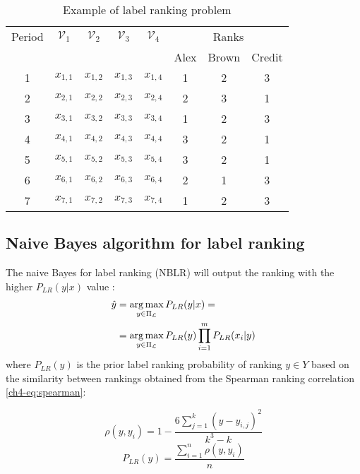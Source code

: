 \documentclass{llncs}\usepackage[]{graphicx}\usepackage[]{color}
\DeclareMathOperator*{\argmax}{arg\,max}
\begin{document}
\begin{table}
\caption{Example of label ranking problem}
\begin{center}
 \begin{tabular}{cccccccc}
\toprule
Period & $\mathcal{V}_1$ & $\mathcal{V}_2$ & $\mathcal{V}_3$ & $\mathcal{V}_4$ &\multicolumn{3}{c}{Ranks}\\
\cline{6-8}
&&&&&Alex&Brown&Credit\\
\midrule
   1 & $x_{1,1}$ & $x_{1,2}$ & $x_{1,3}$ & $x_{1,4}$ &   1 &   2 &   3 \\ 
    2 & $x_{2,1}$ & $x_{2,2}$ & $x_{2,3}$ & $x_{2,4}$ &   2 &   3 &   1 \\ 
    3 & $x_{3,1}$ & $x_{3,2}$ & $x_{3,3}$ & $x_{3,4}$ &   1 &   2 &   3 \\ 
    4 & $x_{4,1}$ & $x_{4,2}$ & $x_{4,3}$ & $x_{4,4}$ &   3 &   2 &   1 \\ 
    5 & $x_{5,1}$ & $x_{5,2}$ & $x_{5,3}$ & $x_{5,4}$ &   3 &   2 &   1 \\ 
    6 & $x_{6,1}$ & $x_{6,2}$ & $x_{6,3}$ & $x_{6,4}$ &   2 &   1 &   3 \\ 
    7 & $x_{7,1}$ & $x_{7,2}$ & $x_{7,3}$ & $x_{7,4}$ &   1 &   2 &   3 \\ 
  
\bottomrule
 \end{tabular}
 \end{center}
\label{ch4-tab:ranking-example}
\end{table}


\subsection{Naive Bayes algorithm for label ranking}
\label{ch4-nbr}
The naive Bayes for label ranking (NBLR)  will output the ranking with the higher $P_{LR}(y|x)$ value \cite{aiguzhinov2010}:
\begin{align}
\label{ch4-eq:nb}
\hat{y}&=\argmax_{y \in \Pi_{\mathcal{L}} }P_{LR}(y|x)= \\ \notag
&=\argmax_{y\in \Pi_{\mathcal{L}} }P_{LR}(y)\prod_{i=1}^m P_{LR}(x_i|y)
\end{align}
where $P_{LR}(y)$ is the prior label ranking probability of ranking $y \in Y$ based on the similarity between rankings obtained from the Spearman ranking correlation \ref{ch4-eq:spearman}:

\begin{multicols}{2}
\begin{equation}
\rho(y,y_i)=1-\frac{6\sum_{j=1}^k(y-y_{i,j})^2}{k^3-k}
\label{ch4-eq:spearman}
\end{equation}\break
\begin{equation}
P_{LR}(y) = \frac{\sum_{i=1}^{n} \rho(y,y_i)}{n}
\label{ch4-eq:prior}
\end{equation}
\end{multicols}
\end{document}
